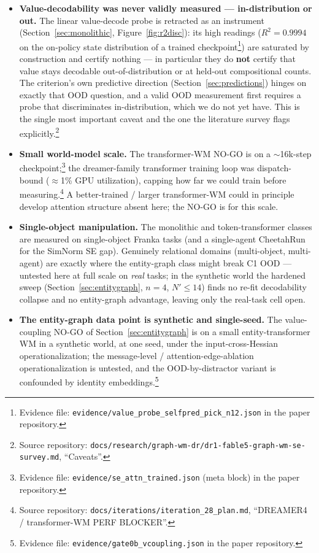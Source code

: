 \documentclass{article}
\begin{document}
\begin{itemize}
\item \textbf{Value-decodability was never validly measured --- in-distribution or out.} The linear value-decode probe is retracted as an instrument (Section~\ref{sec:monolithic}, Figure~\ref{fig:r2disc}): its high readings ($R^2=0.9994$ on the on-policy state distribution of a trained checkpoint\footnote{Evidence file: \texttt{evidence/value\_probe\_selfpred\_pick\_n12.json} in the paper repository.}) are saturated by construction and certify nothing --- in particular they do \textbf{not} certify that value stays decodable out-of-distribution or at held-out compositional counts. The criterion's own predictive direction (Section~\ref{sec:predictions}) hinges on exactly that OOD question, and a valid OOD measurement first requires a probe that discriminates in-distribution, which we do not yet have. This is the single most important caveat and the one the literature survey flags explicitly.\footnote{Source repository: \texttt{docs/research/graph-wm-dr/dr1-fable5-graph-wm-se-survey.md}, ``Caveats''.}

\item \textbf{Small world-model scale.} The transformer-WM NO-GO is on a $\sim$16k-step checkpoint;\footnote{Evidence file: \texttt{evidence/se\_attn\_trained.json} (meta block) in the paper repository.} the dreamer-family transformer training loop was dispatch-bound ($\approx$1\% GPU utilization), capping how far we could train before measuring.\footnote{Source repository: \texttt{docs/iterations/iteration\_28\_plan.md}, ``DREAMER4 / transformer-WM PERF BLOCKER''.} A better-trained / larger transformer-WM could in principle develop attention structure absent here; the NO-GO is for this scale.

\item \textbf{Single-object manipulation.} The monolithic and token-transformer classes are measured on single-object Franka tasks (and a single-agent CheetahRun for the SimNorm SE gap). Genuinely relational domains (multi-object, multi-agent) are exactly where the entity-graph class might break C1 OOD --- untested here at full scale on \emph{real} tasks; in the synthetic world the hardened sweep (Section~\ref{sec:entitygraph}, $n{=}4$, $N' \le 14$) finds no re-fit decodability collapse and no entity-graph advantage, leaving only the real-task cell open.

\item \textbf{The entity-graph data point is synthetic and single-seed.} The value-coupling NO-GO of Section~\ref{sec:entitygraph} is on a small entity-transformer WM in a synthetic world, at one seed, under the input-cross-Hessian operationalization; the message-level / attention-edge-ablation operationalization is untested, and the OOD-by-distractor variant is confounded by identity embeddings.\footnote{Evidence file: \texttt{evidence/gate0b\_vcoupling.json} in the paper repository.}


\end{itemize}
\end{document}
